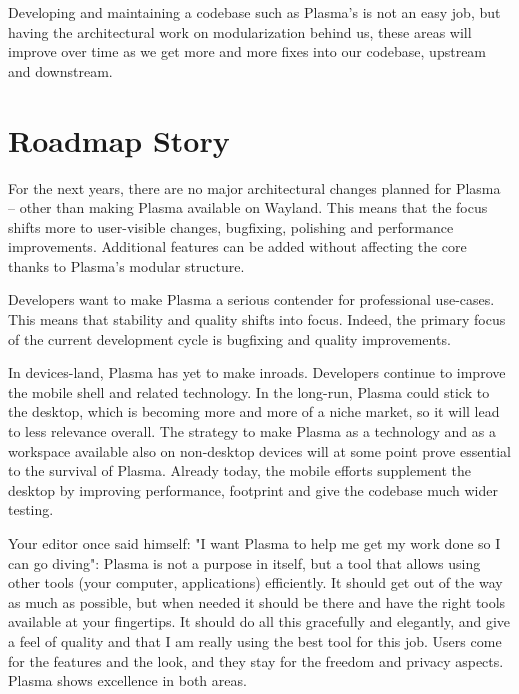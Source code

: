 Developing and maintaining a codebase such as Plasma's is not an easy job, but having the architectural work on modularization behind us, these areas will improve over time as we get more and more fixes into our codebase, upstream and downstream.


\section*{Roadmap Story}

For the next years, there are no major architectural changes planned for Plasma -- other than making Plasma available on Wayland. This means that the focus shifts more to user-visible changes, bugfixing, polishing and performance improvements. Additional features can be added without affecting the core thanks to Plasma's modular structure.

Developers want to make Plasma a serious contender for professional use-cases. This means that stability and quality shifts into focus. Indeed, the primary focus of the current development cycle is bugfixing and quality improvements.

In devices-land, Plasma has yet to make inroads. Developers continue to improve the mobile shell and related technology. In the long-run, Plasma could stick to the desktop, which is becoming more and more of a niche market, so it will lead to less relevance overall. The strategy to make Plasma as a technology and as a workspace available also on non-desktop devices will at some point prove essential to the survival of Plasma. Already today, the mobile efforts supplement the desktop by improving performance, footprint and give the codebase much wider testing.

Your editor once said himself: "I want Plasma to help me get my work done so I can go diving": Plasma is not a purpose in itself, but a tool that allows using other tools (your computer, applications) efficiently. It should get out of the way as much as possible, but when needed it should be there and have the right tools available at your fingertips. It should do all this gracefully and elegantly, and give a feel of quality and that I am really using the best tool for this job. Users come for the features and the look, and they stay for the freedom and privacy aspects. Plasma shows excellence in both areas.
